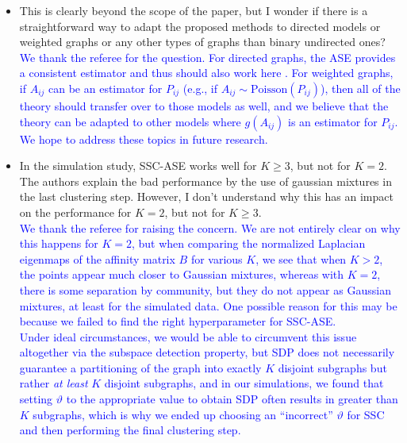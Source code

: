 \documentclass[
]{article}
\begin{document}
\begin{itemize}
{  SSC-ASE does rely on the latent configuration, but we show that the orthogonality property holds for the particular embedding we perform for this algorithm. 
  }\\
  \textcolor{blue}{
  That said, looking back at the latent configuration in Theorem 1, we can see that a $K$-dimensional (not $K^2$-dimensional) latent configuration is sufficient for clustering. 
  If we are able to obtain this exact embedding, this would greatly reduce the number of dimensions required for the embedding. 
  In practice, this isn't always possible due to the nonidentifiability issue (in particular, determining which of the $K$ out of $K^2$ eigenvectors should be used).
  }
\item
  This is clearly beyond the scope of the paper, but I wonder if there
  is a straightforward way to adapt the proposed methods to directed
  models or weighted graphs or any other types of graphs than binary
  undirected ones?\\
  \textcolor{blue}{
  We thank the referee for the question. 
  For directed graphs, the ASE provides a consistent estimator and thus should also work here \citep{doi:10.1080/01621459.2012.699795}. 
  For weighted graphs, if $A_{ij}$ can be an estimator for $P_{ij}$ (e.g., if $A_{ij} \sim \mathrm{Poisson}(P_{ij})$), then all of the theory should transfer over to those models as well, 
  and we believe that the theory can be adapted to other models where $g(A_{ij})$ is an estimator for $P_{ij}$. 
  We hope to address these topics in future research. 
  }
\item
  In the simulation study, SSC-ASE works well for \(K \geq 3\), but not
  for \(K = 2\). The authors explain the bad performance by the use of
  gaussian mixtures in the last clustering step. However, I don't
  understand why this has an impact on the performance for \(K = 2\),
  but not for \(K \geq 3\).\\
  \textcolor{blue}{
  We thank the referee for raising the concern. 
  We are not entirely clear on why this happens for $K = 2$, but when comparing the normalized Laplacian eigenmaps of the affinity matrix $B$ for various $K$, we see that when $K > 2$, the points appear much closer to Gaussian mixtures, whereas with $K = 2$, there is some separation by community, but they do not appear as Gaussian mixtures, at least for the simulated data. 
  One possible reason for this may be because we failed to find the right hyperparameter for SSC-ASE. 
  }\\
  \textcolor{blue}{
  Under ideal circumstances, we would be able to circumvent this issue altogether via the subspace detection property, but SDP does not necessarily guarantee a partitioning of the graph into exactly $K$ disjoint subgraphs but rather {\em at least} $K$ disjoint subgraphs, and in our simulations, we found that setting $\vartheta$ to the appropriate value to obtain SDP often results in greater than $K$ subgraphs, which is why we ended up choosing an ``incorrect'' $\vartheta$ for SSC and then performing the final clustering step.
}
\end{itemize}
\end{document}

